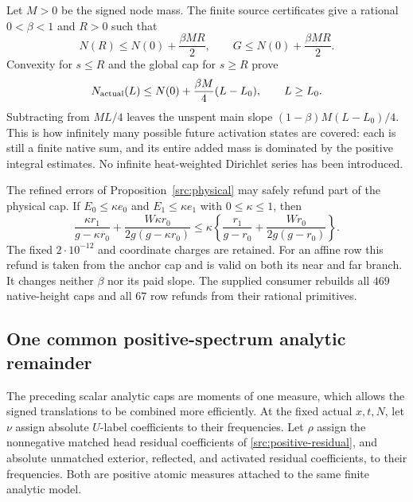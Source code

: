 \documentclass[11pt,a4paper]{article}
\theoremstyle{definition}
\theoremstyle{remark}
\begin{document}
Let $M>0$ be the signed node mass.  The finite source certificates give a rational
$0<\beta<1$ and $R>0$ such that
\[
 N(R)\leq N(0)+\frac{\beta MR}{2},\qquad
 G\leq N(0)+\frac{\beta MR}{2}.
\]
Convexity for $s\leq R$ and the global cap for $s\geq R$ prove
\begin{equation}
 N_{\rm actual}(L)\leq N(0)+\frac{\beta M}{4}(L-L_0),
 \qquad L\geq L_0.
 \label{src:affine-native}
\end{equation}
Subtracting from $ML/4$ leaves the unspent main slope
$(1-\beta)M(L-L_0)/4$.  This is how infinitely many possible future
activation states are covered: each is still a finite native sum, and
its entire added mass is dominated by the positive integral estimates.
No infinite heat-weighted Dirichlet series has been introduced.

The refined errors of Proposition~\ref{src:physical} may safely refund
part of the physical cap.  If $E_0\leq\kappa e_0$ and
$E_1\leq\kappa e_1$ with $0\leq\kappa\leq1$, then
\[
 \frac{\kappa r_1}{g-\kappa r_0}
 +\frac{W\kappa r_0}{2g(g-\kappa r_0)}
 \leq\kappa\left\{\frac{r_1}{g-r_0}
             +\frac{Wr_0}{2g(g-r_0)}\right\}.
\]
The fixed $2\cdot10^{-12}$ and coordinate charges are retained.
For an affine row this refund is taken from the anchor cap and is valid
on both its near and far branch.  It changes neither $\beta$ nor its
paid slope.  The supplied consumer rebuilds all $469$ native-height
caps and all $67$ row refunds from their rational primitives.

\subsection{One common positive-spectrum analytic remainder}
\label{src:measure}

The preceding scalar analytic caps are moments of one measure, which
allows the signed translations to be combined more efficiently.  At the
fixed actual $x,t,N$, let $\nu$ assign absolute $U$-label coefficients
to their frequencies.  Let $\rho$ assign the nonnegative matched head
residual coefficients of \eqref{src:positive-residual}, and absolute
unmatched exterior, reflected, and activated residual coefficients, to
their frequencies.  Both are positive atomic measures attached to the
same finite analytic model.
\end{document}
